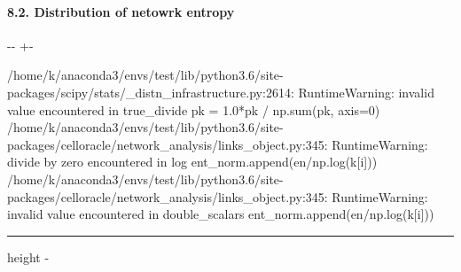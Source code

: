 \documentclass[letterpaper,10pt,english]{sphinxmanual}
\newlength\nbsphinxcodecellspacing
\begin{document}
\paragraph{8.2. Distribution of netowrk entropy}
\label{\detokenize{notebooks/04_Network_analysis/Network_analysis_with_Paul_etal_2015_data:8.2.-Distribution-of-netowrk-entropy}}
{
\begin{sphinxVerbatim}[commandchars=\\\{\}]
\llap{\color{nbsphinxin}[62]:\,\hspace{\fboxrule}\hspace{\fboxsep}} 


\end{sphinxVerbatim}
}

{

\kern-\sphinxverbatimsmallskipamount\kern-\baselineskip
\kern+\FrameHeightAdjust\kern-\fboxrule
\vspace{\nbsphinxcodecellspacing}

\begin{sphinxVerbatim}[commandchars=\\\{\}]
/home/k/anaconda3/envs/test/lib/python3.6/site-packages/scipy/stats/\_distn\_infrastructure.py:2614: RuntimeWarning: invalid value encountered in true\_divide
  pk = 1.0*pk / np.sum(pk, axis=0)
/home/k/anaconda3/envs/test/lib/python3.6/site-packages/celloracle/network\_analysis/links\_object.py:345: RuntimeWarning: divide by zero encountered in log
  ent\_norm.append(en/np.log(k[i]))
/home/k/anaconda3/envs/test/lib/python3.6/site-packages/celloracle/network\_analysis/links\_object.py:345: RuntimeWarning: invalid value encountered in double\_scalars
  ent\_norm.append(en/np.log(k[i]))
\end{sphinxVerbatim}
}

\hrule height -\fboxrule\relax
\vspace{\nbsphinxcodecellspacing}
\end{document}
